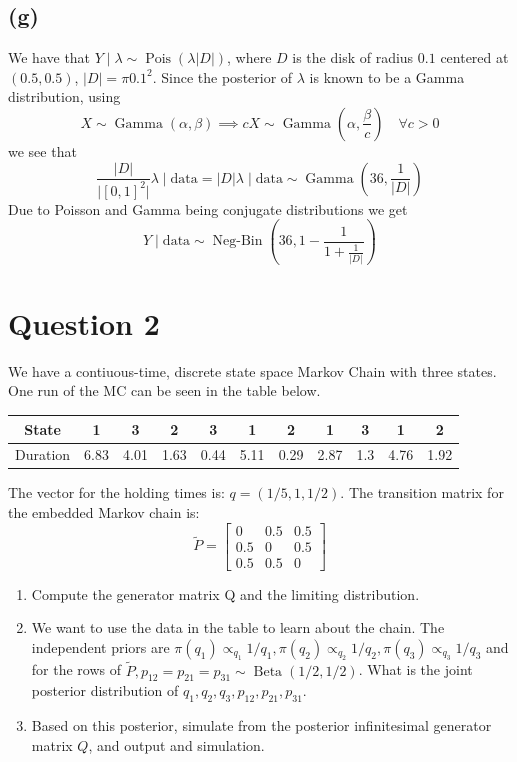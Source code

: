 \documentclass{article}
\DeclareMathOperator\Beta{Beta}
\DeclareMathOperator\Poisson{Pois}
\DeclareMathOperator\GammaDist{Gamma}
\DeclareMathOperator\NegBin{Neg-Bin}
\newcommand{\size}[1]{\lvert #1 \rvert}
\begin{document}
\subsection{(g)}
We have that $Y \mid \lambda \sim \Poisson(\lambda \lvert D \rvert)$,
where $D$ is the disk of radius $0.1$ centered at $(0.5, 0.5)$,
$\lvert D \rvert = \pi 0.1^2$.
Since the posterior of $\lambda$ is known to be a Gamma distribution, using
$$ X \sim \GammaDist(\alpha, \beta) \implies cX \sim \GammaDist(\alpha, \frac\beta c) \quad \forall c>0 $$
we see that
$$ \frac{\size{D}}{\size{[0, 1]^2}} \lambda \mid \text{data} = \size{D} \lambda \mid \text{data}
\sim \GammaDist(36, \frac1{\size{D}}) $$
Due to Poisson and Gamma being conjugate distributions we get
$$ Y \mid \text{data} \sim \NegBin(36, 1 - \frac1{1 + \frac1{\size{D}}}) $$

\section{Question 2}
We have a contiuous-time, discrete state space Markov Chain with three states.
One run of the MC can be seen in the table below.
\begin{center}
\begin{tabular}{c|c|c|c|c|c|c|c|c|c|c|} 
 State & 1 & 3 & 2 & 3 & 1 & 2 & 1 & 3 & 1 & 2 \\
 \hline
 Duration & 6.83 & 4.01 & 1.63 & 0.44 & 5.11 & 0.29 & 2.87 & 1.3 & 4.76 & 1.92 
\end{tabular}
\end{center}
The vector for the holding times is: $q = (1/5, 1, 1/2)$.
The transition matrix for the embedded Markov chain is:
$$ \tilde{P} = \begin{bmatrix}
0 & 0.5 & 0.5\\
0.5 & 0 & 0.5\\
0.5 & 0.5 & 0
\end{bmatrix} $$
\begin{enumerate}[label=(\alph*)]
	\item Compute the generator matrix Q and the limiting distribution.
	\item We want to use the data in the table to learn about the chain. The independent priors are $\pi(q_1) \propto_{q_1} 1/q_1, \pi(q_2) \propto_{q_2} 1/q_2, \pi(q_3) \propto_{q_3} 1/q_3$ and for the rows of $\tilde{P}, p_{12} = p_{21} = p_{31} \sim \Beta(1/2, 1/2)$. What is the joint posterior distribution of $q_1, q_2, q_3, p_{12}, p_{21}, p_{31}.$
	\item Based on this posterior, simulate from the posterior infinitesimal generator matrix $Q$, and output and simulation.
\end{enumerate}
\end{document}
